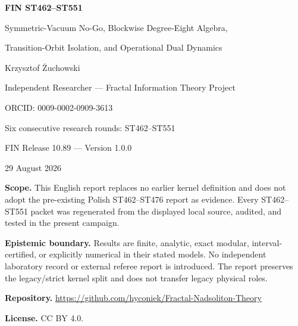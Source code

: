 \documentclass[11pt,a4paper]{article}
\theoremstyle{definition}\newtheorem{definition}[theorem]{Definition}
\theoremstyle{remark}\newtheorem{remark}[theorem]{Remark}
\begin{document}
\hypersetup{pageanchor=false}
\begin{titlepage}\centering\vspace*{13mm}
{\Huge\bfseries FIN ST462--ST551\par}\vspace{4mm}
{\Large Symmetric-Vacuum No-Go, Blockwise Degree-Eight Algebra,\par}
{\Large Transition-Orbit Isolation, and Operational Dual Dynamics\par}\vspace{12mm}
{\Large Krzysztof Żuchowski\par}\vspace{2mm}
{\normalsize Independent Researcher --- Fractal Information Theory Project\par}
{\normalsize ORCID: 0009-0002-0909-3613\par}\vspace{9mm}
{\large Six consecutive research rounds: ST462--ST551\par}
{\large FIN Release 10.89 --- Version 1.0.0\par}
{\large 29 August 2026\par}
\vfill
\begin{minipage}{0.91\textwidth}\small
\textbf{Scope.} This English report replaces no earlier kernel definition and does not adopt the pre-existing Polish ST462--ST476 report as evidence. Every ST462--ST551 packet was regenerated from the displayed local source, audited, and tested in the present campaign.

\medskip\textbf{Epistemic boundary.} Results are finite, analytic, exact modular, interval-certified, or explicitly numerical in their stated models. No independent laboratory record or external referee report is introduced. The report preserves the legacy/strict kernel split and does not transfer legacy physical roles.

\medskip\textbf{Repository.} \url{https://github.com/hyconiek/Fractal-Nadsoliton-Theory}

\textbf{License.} CC BY 4.0.
\end{minipage}\vfill
\end{titlepage}\hypersetup{pageanchor=true}
\end{document}
